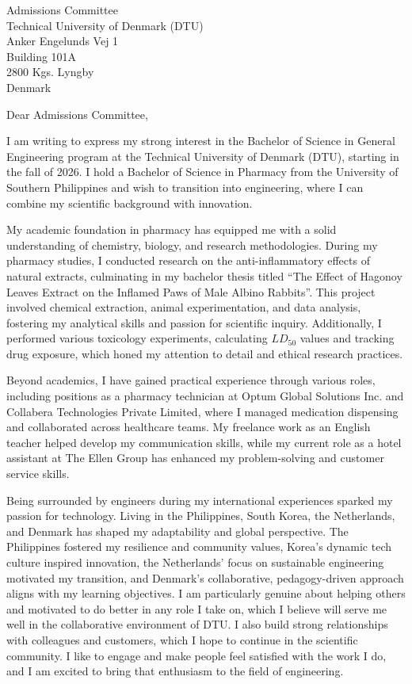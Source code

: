 \documentclass[11pt,a4paper]{letter}
\date{February 22, 2026}
\begin{document}
\begin{letter}{Admissions Committee \\ Technical University of Denmark (DTU) \\ Anker Engelunds Vej 1 \\ Building 101A \\ 2800 Kgs. Lyngby \\ Denmark}

\opening{Dear Admissions Committee,}

I am writing to express my strong interest in the Bachelor of Science in General Engineering program at the Technical University of Denmark (DTU), starting in the fall of 2026. I hold a Bachelor of Science in Pharmacy from the University of Southern Philippines and wish to transition into engineering, where I can combine my scientific background with innovation.

My academic foundation in pharmacy has equipped me with a solid understanding of chemistry, biology, and research methodologies. During my pharmacy studies, I conducted research on the anti-inflammatory effects of natural extracts, culminating in my bachelor thesis titled \enquote{The Effect of Hagonoy Leaves Extract on the Inflamed Paws of Male Albino Rabbits}. This project involved chemical extraction, animal experimentation, and data analysis, fostering my analytical skills and passion for scientific inquiry. Additionally, I performed various toxicology experiments, calculating $LD_{50}$ values and tracking drug exposure, which honed my attention to detail and ethical research practices.

Beyond academics, I have gained practical experience through various roles, including positions as a pharmacy technician at Optum Global Solutions Inc. and Collabera Technologies Private Limited, where I managed medication dispensing and collaborated across healthcare teams. My freelance work as an English teacher helped develop my communication skills, while my current role as a hotel assistant at The Ellen Group has enhanced my problem-solving and customer service skills.

Being surrounded by engineers during my international experiences sparked my passion for technology. Living in the Philippines, South Korea, the Netherlands, and Denmark has shaped my adaptability and global perspective. The Philippines fostered my resilience and community values, Korea's dynamic tech culture inspired innovation, the Netherlands' focus on sustainable engineering motivated my transition, and Denmark's collaborative, pedagogy-driven approach aligns with my learning objectives. I am particularly genuine about helping others and motivated to do better in any role I take on, which I believe will serve me well in the collaborative environment of DTU. I also build strong relationships with colleagues and customers, which I hope to continue in the scientific community. I like to engage and make people feel satisfied with the work I do, and I am excited to bring that enthusiasm to the field of engineering.


\end{letter}
\end{document}
